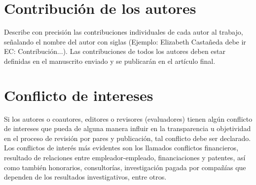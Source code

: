 \documentclass[9pt]{article}
\begin{document}
\section*{Contribución de los autores}

Describe con precisión las contribuciones individuales de cada autor al trabajo, señalando el nombre del autor con siglas (Ejemplo: Elizabeth Castañeda debe ir EC: Contribución...).
Las contribuciones de todos los autores deben estar definidas en el manuscrito enviado y se publicarán en el artículo final.


\section*{Conflicto de intereses}

Si los autores o coautores, editores o revisores (evaluadores) tienen algún conflicto de intereses que pueda de alguna manera influir en la transparencia u objetividad en el proceso de revisión por pares y publicación, tal conflicto debe ser declarado.
Los conflictos de interés más evidentes son los llamados conflictos financieros, resultado de relaciones entre empleador-empleado, financiaciones y patentes, así como también honorarios,
consultorías, investigación pagada por compañías que dependen de los resultados investigativos, entre otros.



\end{document}

